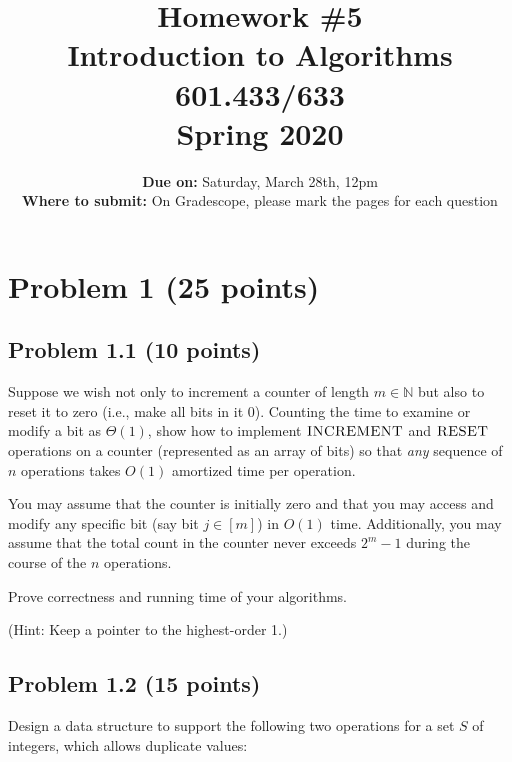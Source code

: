 \documentclass[letterpaper, 11pt]{article}
\begin{document}
\title{Homework \#5 \\ Introduction to Algorithms \\ 601.433/633 \\ Spring 2020}
\author{\textbf{Due on:} Saturday, March 28th, 12pm \\
\textbf{Where to submit:} On Gradescope, please mark the pages for each question
\\}
\date{}
\vspace{-0.5cm}
\maketitle

\section{Problem 1 (25 points)}
\subsection{Problem 1.1 (10 points)}
Suppose we wish not only to increment a counter of length $m \in \mathbb{N}$ but also to reset it to zero (i.e., make all bits in it 0). Counting the time to examine or modify a bit as $\Theta(1)$, show how to implement $\textsc{INCREMENT}$ and $\textsc{RESET}$ operations on a counter (represented as an array of bits) so that \emph{any} sequence of $n$ operations takes $O(1)$ amortized time per operation. 

You may assume that the counter is initially zero and that you may access and modify any specific bit (say bit $j \in [m]$) in $O(1)$ time. Additionally, you may assume that the total count in the counter never exceeds $2^{m} - 1$ during the course of the $n$ operations.

Prove correctness and running time of your algorithms.

(Hint: Keep a pointer to the highest-order 1.)





\subsection{Problem 1.2 (15 points)}
Design a data structure to support the following two operations for a set $S$ of integers, which allows duplicate values:
\end{document}
